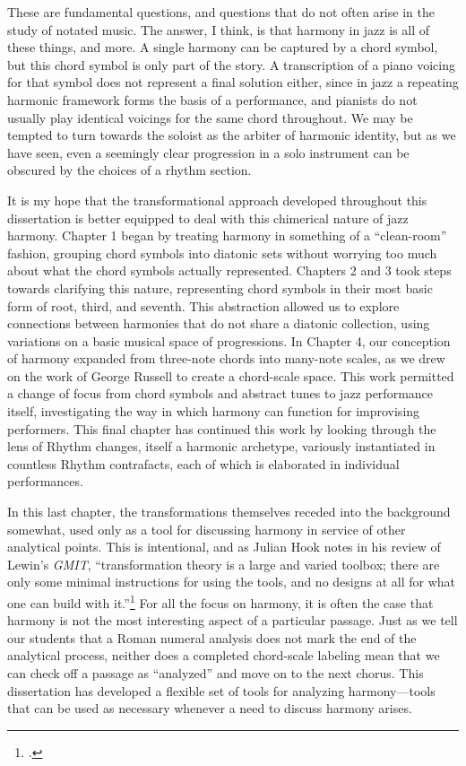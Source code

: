 These are fundamental questions, and questions that do not often arise in the
study of notated music. The answer, I think, is that harmony in jazz is all of
these things, and more. A single harmony can be captured by a chord symbol,
but this chord symbol is only part of the story. A transcription of a piano
voicing for that symbol does not represent a final solution either, since in
jazz a repeating harmonic framework forms the basis of a performance, and
pianists do not usually play identical voicings for the same chord throughout.
We may be tempted to turn towards the soloist as the arbiter of harmonic
identity, but as we have seen, even a seemingly clear progression in a solo
instrument can be obscured by the choices of a rhythm section.

It is my hope that the transformational approach developed throughout this
dissertation is better equipped to deal with this chimerical nature of jazz
harmony. Chapter 1 began by treating harmony in something of a ``clean-room''
fashion, grouping chord symbols into diatonic sets without worrying too much
about what the chord symbols actually represented. Chapters 2 and 3 took steps
towards clarifying this nature, representing chord symbols in their most basic
form of root, third, and seventh. This abstraction allowed us to explore
connections between harmonies that do not share a diatonic collection, using
variations on a basic musical space of \tfo progressions. In Chapter 4, our
conception of harmony expanded from three-note chords into many-note scales,
as we drew on the work of George Russell to create a chord-scale space. This
work permitted a change of focus from chord symbols and abstract tunes to jazz
performance itself, investigating the way in which harmony can function for
improvising performers. This final chapter has continued this work by looking
through the lens of Rhythm changes, itself a harmonic archetype, variously
instantiated in countless Rhythm contrafacts, each of which is elaborated in
individual performances.

In this last chapter, the transformations themselves receded into the
background somewhat, used only as a tool for discussing harmony in service
of other analytical points. This is intentional, and as Julian Hook notes in
his review of Lewin's \emph{GMIT}, ``transformation theory is a large and
varied toolbox; there are only some minimal instructions for using the tools,
and no designs at all for what one can build with
it.''\footcite[166]{hook:2007gmit} For all the focus on harmony, it is often
the case that harmony is not the most interesting aspect of a particular
passage. Just as we tell our students that a Roman numeral analysis does not
mark the end of the analytical process, neither does a completed chord-scale
labeling mean that we can check off a passage as ``analyzed'' and move on to
the next chorus. This dissertation has developed a flexible set of tools for
analyzing harmony---\allowbreak tools that can be used as necessary whenever a
need to discuss harmony arises.

